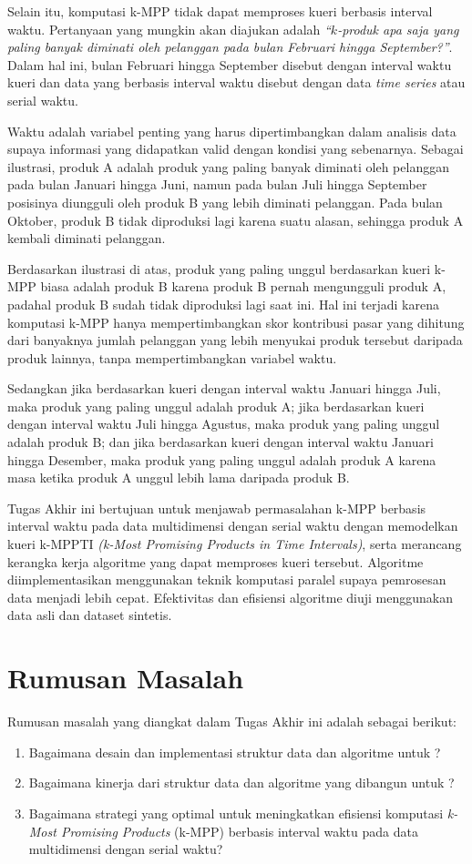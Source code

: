 Selain itu, komputasi k-MPP tidak dapat memproses kueri berbasis interval waktu. Pertanyaan yang mungkin akan diajukan adalah \textit{“$k$-produk apa saja yang paling banyak diminati oleh pelanggan pada bulan Februari hingga September?”}. Dalam hal ini, bulan Februari hingga September disebut dengan interval waktu kueri dan data yang berbasis interval waktu disebut dengan data \textit{time series} atau serial waktu.

Waktu adalah variabel penting yang harus dipertimbangkan dalam analisis data supaya informasi yang didapatkan valid dengan kondisi yang sebenarnya. Sebagai ilustrasi, produk A adalah produk yang paling banyak diminati oleh pelanggan pada bulan Januari hingga Juni, namun pada bulan Juli hingga September posisinya diungguli oleh produk B yang lebih diminati pelanggan. Pada bulan Oktober, produk B tidak diproduksi lagi karena suatu alasan, sehingga produk A kembali diminati pelanggan.  

Berdasarkan ilustrasi di atas, produk yang paling unggul berdasarkan kueri k-MPP biasa adalah produk B karena produk B pernah mengungguli produk A, padahal produk B sudah tidak diproduksi lagi saat ini. Hal ini terjadi karena komputasi k-MPP hanya mempertimbangkan skor kontribusi pasar yang dihitung dari banyaknya jumlah pelanggan yang lebih menyukai produk tersebut daripada produk lainnya, tanpa mempertimbangkan variabel waktu.

Sedangkan jika berdasarkan kueri dengan interval waktu Januari hingga Juli, maka produk yang paling unggul adalah produk A; jika berdasarkan kueri dengan interval waktu Juli hingga Agustus, maka produk yang paling unggul adalah produk B; dan jika berdasarkan kueri dengan interval waktu Januari hingga Desember, maka produk yang paling unggul adalah produk A karena masa ketika produk A unggul lebih lama daripada produk B.

Tugas Akhir ini bertujuan untuk menjawab permasalahan k-MPP berbasis interval waktu pada data multidimensi dengan serial waktu dengan memodelkan kueri k-MPPTI \textit{(k-Most Promising Products in Time Intervals)}, serta merancang kerangka kerja algoritme yang dapat memproses kueri tersebut. Algoritme diimplementasikan menggunakan teknik komputasi paralel supaya pemrosesan data menjadi lebih cepat. Efektivitas dan efisiensi algoritme diuji menggunakan data asli dan dataset sintetis.

\section{Rumusan Masalah}
\tab Rumusan masalah yang diangkat dalam Tugas Akhir ini adalah sebagai berikut:
\begin{enumerate}
	\item Bagaimana desain dan implementasi struktur data dan algoritme untuk \problem?
	\item Bagaimana kinerja dari struktur data dan algoritme yang dibangun untuk \problem?
	\item Bagaimana strategi yang optimal untuk meningkatkan efisiensi komputasi \textit{k-Most Promising Products} (k-MPP) berbasis interval waktu pada data multidimensi dengan serial waktu?
\end{enumerate}


